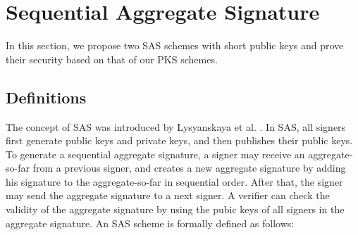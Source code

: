 \documentclass[11pt,letterpaper]{article}
\begin{document}
\section{Sequential Aggregate Signature} \label{sec:sas}

In this section, we propose two SAS schemes with short public keys and prove
their security based on that of our PKS schemes.

\subsection{Definitions} \label{sec:sas-def}

The concept of SAS was introduced by Lysyanskaya et al.
\cite{LysyanskayaMRS04}. In SAS, all signers first generate public keys and
private keys, and then publishes their public keys. To generate a sequential
aggregate signature, a signer may receive an aggregate-so-far from a previous
signer, and creates a new aggregate signature by adding his signature to the
aggregate-so-far in sequential order. After that, the signer may send the
aggregate signature to a next signer. A verifier can check the validity of
the aggregate signature by using the pubic keys of all signers in the
aggregate signature. An SAS scheme is formally defined as follows:
\end{document}
